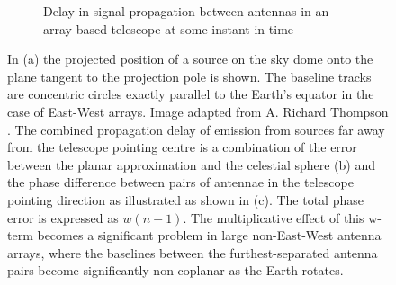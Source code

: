 \begin{figure}[h]
\begin{mdframed}
\begin{subfigure}[b]{0.45\textwidth}
      \caption{Delay in signal propagation between antennas in an array-based telescope at some instant in time}
    \end{subfigure}
    \caption[Widefield phase delay]{In (a) the projected position of a source on the sky dome onto the plane tangent to the projection pole is shown. The baseline tracks
    are concentric circles exactly parallel to the Earth's equator in the case of East-West arrays. Image adapted from A. Richard Thompson \cite[Lecture 2]{taylor1999synthesis}. 
    The combined propagation delay of emission from sources far away from the telescope pointing centre is a combination
    of the error between the planar approximation and the celestial sphere (b) and the phase difference between pairs of antennae in the telescope
    pointing direction as illustrated as shown in (c). The total phase error is expressed as $w(n-1)$. The multiplicative effect of this w-term becomes a
    significant problem in large non-East-West antenna arrays, where the baselines between the furthest-separated antenna pairs become significantly non-coplanar 
    as the Earth rotates.}
    \label{fig_wide_field_error}
  \end{mdframed}
\end{figure}

